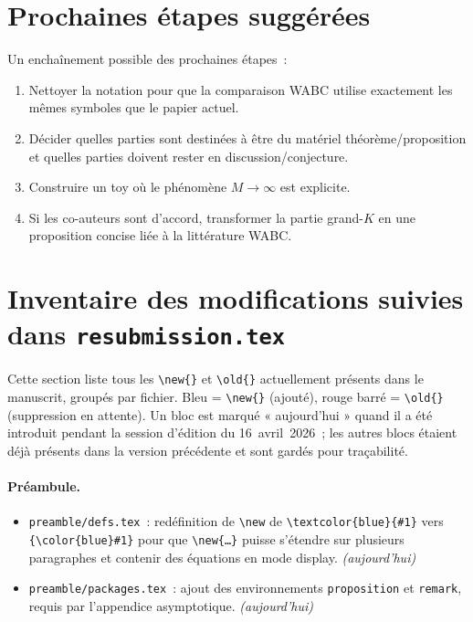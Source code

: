 \documentclass[11pt]{article}
\begin{document}
\section{Prochaines étapes suggérées}

Un enchaînement possible des prochaines étapes~:
\begin{enumerate}[label=(\arabic*)]
    \item Nettoyer la notation pour que la comparaison WABC utilise exactement les mêmes
    symboles que le papier actuel.
    \item Décider quelles parties sont destinées à être du matériel théorème/proposition et
    quelles parties doivent rester en discussion/conjecture.
    \item Construire un toy où le phénomène $M \to \infty$ est explicite.
    \item Si les co-auteurs sont d'accord, transformer la partie grand-$K$ en une proposition
    concise liée à la littérature WABC.
\end{enumerate}

\iffalse
\section{Inventaire des modifications suivies dans \texttt{resubmission.tex}}
\label{sec:tracked_changes}

Cette section liste tous les \texttt{\textbackslash new\{\}} et \texttt{\textbackslash old\{\}}
actuellement présents dans le manuscrit, groupés par fichier. Bleu = \texttt{\textbackslash new\{\}}
(ajouté), rouge barré = \texttt{\textbackslash old\{\}} (suppression en attente). Un bloc est
marqué « aujourd'hui » quand il a été introduit pendant la session d'édition du 16~avril~2026~;
les autres blocs étaient déjà présents dans la version précédente et sont gardés pour
traçabilité.

\paragraph{Préambule.}
\begin{itemize}[nosep]
    \item \texttt{preamble/defs.tex}~: redéfinition de \texttt{\textbackslash new} de
    \texttt{\textbackslash textcolor\{blue\}\{\#1\}} vers \texttt{\{\textbackslash color\{blue\}\#1\}}
    pour que \texttt{\textbackslash new\{\ldots\}} puisse s'étendre sur plusieurs paragraphes
    et contenir des équations en mode display. \textit{(aujourd'hui)}
    \item \texttt{preamble/packages.tex}~: ajout des environnements \texttt{proposition} et
    \texttt{remark}, requis par l'appendice asymptotique. \textit{(aujourd'hui)}
\end{itemize}
\end{document}
